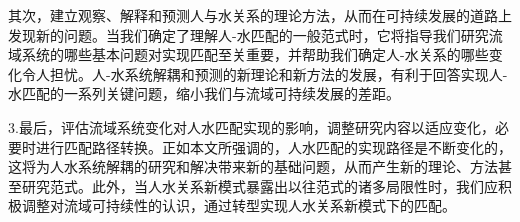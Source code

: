 其次，建立观察、解释和预测人与水关系的理论方法，从而在可持续发展的道路上发现新的问题。当我们确定了理解人-水匹配的一般范式时，它将指导我们研究流域系统的哪些基本问题对实现匹配至关重要，并帮助我们确定人-水关系的哪些变化令人担忧。人-水系统解耦和预测的新理论和新方法的发展，有利于回答实现人-水匹配的一系列关键问题，缩小我们与流域可持续发展的差距。

3.最后，评估流域系统变化对人水匹配实现的影响，调整研究内容以适应变化，必要时进行匹配路径转换。正如本文所强调的，人水匹配的实现路径是不断变化的，这将为人水系统解耦的研究和解决带来新的基础问题，从而产生新的理论、方法甚至研究范式。此外，当人水关系新模式暴露出以往范式的诸多局限性时，我们应积极调整对流域可持续性的认识，通过转型实现人水关系新模式下的匹配。


